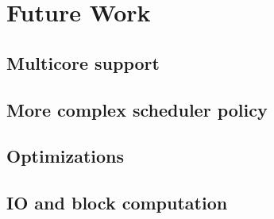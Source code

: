 
\chapter{Future Work}
\label{ch:future_work}


\section{Multicore support}
\section{More complex scheduler policy}
\section{Optimizations}
\section{IO and block computation}

